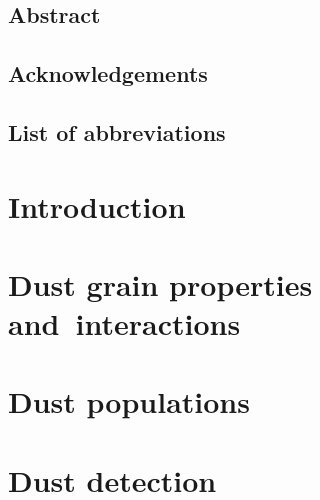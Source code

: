 \documentclass[11pt,twoside,openright]{book}
\begin{document}
\frontmatter


\newpage\null\thispagestyle{empty}\newpage

\setcounter{page}{1}\thispagestyle{empty}\newpage

\section*{Abstract}

\newpage\null\newpage

\section*{Acknowledgements}

\newpage\null\newpage

\tableofcontents

\newpage\null\newpage
\section*{List of abbreviations}

\newpage\null\newpage



\mainmatter

\chapter{Introduction}


\chapter{Dust grain properties\\and~interactions}\label{ch:forces}


\chapter{Dust populations}\label{ch:populations}


\chapter{Dust detection}

\end{document}
